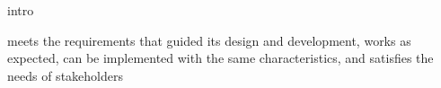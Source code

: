 intro

meets the requirements that guided its design and development,
works as expected,
can be implemented with the same characteristics,
and satisfies the needs of stakeholders